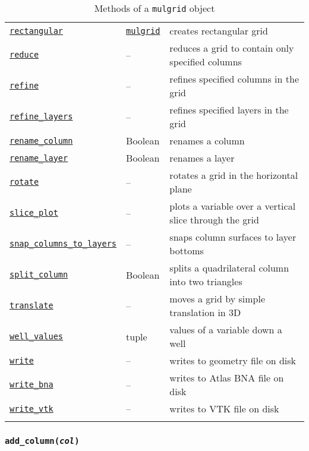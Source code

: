 \begin{center}
\begin{longtable}{|l|l|p{70mm}|}
  \hyperref[sec:mulgrid:rectangular]{\texttt{rectangular}} & \hyperref[mulgrids]{\texttt{mulgrid}} & creates rectangular grid\\
  \hyperref[sec:mulgrid:reduce]{\texttt{reduce}} & -- & reduces a grid to contain only specified columns\\
  \hyperref[sec:mulgrid:refine]{\texttt{refine}} & -- & refines specified columns in the grid\\
  \hyperref[sec:mulgrid:refine_layers]{\texttt{refine\_layers}} & -- & refines specified layers in the grid\\
  \hyperref[sec:mulgrid:rename_column]{\texttt{rename\_column}} & Boolean & renames a column\\
  \hyperref[sec:mulgrid:rename_layer]{\texttt{rename\_layer}} & Boolean & renames a layer\\
  \hyperref[sec:mulgrid:rotate]{\texttt{rotate}} & -- & rotates a grid in the horizontal plane\\
  \hyperref[sec:mulgrid:slice_plot]{\texttt{slice\_plot}} & -- & plots a variable over a vertical slice through the grid\\
  \hyperref[sec:mulgrid:snap_columns_to_layers]{\texttt{snap\_columns\_to\_layers}} & -- & snaps column surfaces to layer bottoms\\
  \hyperref[sec:mulgrid:split_column]{\texttt{split\_column}} & Boolean & splits a quadrilateral column into two triangles\\ 
  \hyperref[sec:mulgrid:translate]{\texttt{translate}} & -- & moves a grid by simple translation in 3D\\
  \hyperref[sec:mulgrid:well_values]{\texttt{well\_values}} & tuple & values of a variable down a well\\
  \hyperref[sec:mulgrid:write]{\texttt{write}} & -- & writes to geometry file on disk\\
  \hyperref[sec:mulgrid:write_bna]{\texttt{write\_bna}} & -- & writes to Atlas BNA file on disk\\ 
  \hyperref[sec:mulgrid:write_vtk]{\texttt{write\_vtk}} &  -- & writes to VTK file on disk\\
  \hline
  \caption{Methods of a \texttt{mulgrid} object}
  \label{tb:mulgrid_methods}
\end{longtable}
\end{center}

\begin{snugshade}\subsubsection{\texttt{add\_column(\emph{col})}}\end{snugshade}
\label{sec:mulgrid:add_column}

